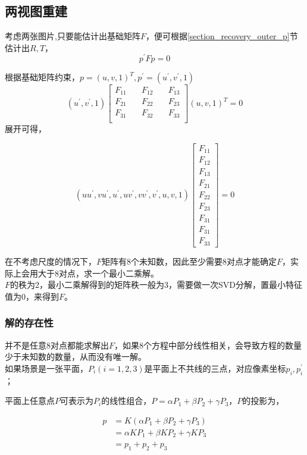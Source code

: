 	\subsection{两视图重建}

	考虑两张图片,只要能估计出基础矩阵$F$，便可根据\ref{section_recovery_outer_p}节估计出$R,T$，
	$$
		p^\prime F p = 0
	$$

	根据基础矩阵约束，$p=(u,v,1)^T,p^{\prime} = (u^{\prime}, v^{\prime},1)$
	$$
		(u^{\prime}, v^{\prime},1)
		\begin{bmatrix}
			F_{11}\quad& F_{12}\quad& F_{13}\\
			F_{21}\quad& F_{22}\quad& F_{23}\\
			F_{31}\quad& F_{32}\quad& F_{33}\\
		\end{bmatrix}
		(u,v,1)^T = 0
	$$
	展开可得，

	$$
		\left(uu^{\prime}, vu^{\prime}, u^{\prime}, uv^{\prime},vv^{\prime},v^{\prime},u,v,1\right)
		\begin{bmatrix*}
			F_{11}\\
			F_{12}\\
			F_{13}\\
			F_{21}\\
			F_{22}\\
			F_{23}\\
			F_{31}\\
			F_{31}\\
			F_{33}
		\end{bmatrix*} = 0
	$$

	在不考虑尺度的情况下，$F$矩阵有8个未知数，因此至少需要8对点才能确定$F$，实际上会用大于8对点，求一个最小二乘解。\\

	$F$的秩为2，最小二乘解得到的矩阵秩一般为3，需要做一次SVD分解，置最小特征值为0，来得到$F$。

	\subsubsection*{解的存在性}
		并不是任意8对点都能求解出$F$，如果8个方程中部分线性相关，会导致方程的数量少于未知数的数量，从而没有唯一解。\\

		如果场景是一张平面，$P_i(i=1,2,3)$是平面上不共线的三点，对应像素坐标$p_i,p^\prime_i$；

		平面上任意点$P$可表示为$P_i$的线性组合，$P=\alpha P_1 + \beta P_2 + \gamma P_3$，$P$的投影为，
		
		\begin{align*}
			p &= K\left(\alpha P_1 + \beta P_2 + \gamma P_3\right)\\
				&= \alpha KP_1 + \beta K P_2 + \gamma KP_3\\
				&= p_1 + p_2 + p_3
		\end{align*}

